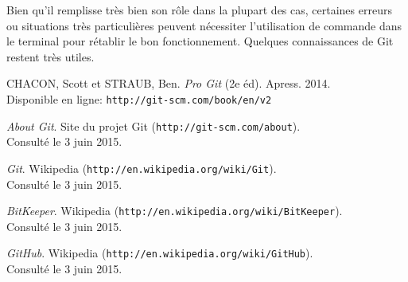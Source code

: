 \documentclass[11pt,a4paper]{article}
\begin{document}
Bien qu'il remplisse très bien son rôle dans la plupart des cas, certaines erreurs ou situations très particulières peuvent nécessiter l'utilisation de commande dans le terminal pour rétablir le bon fonctionnement.
Quelques connaissances de Git restent très utiles.

\pagebreak
\begin{thebibliography}{1}

	CHACON, Scott et STRAUB, Ben. {\em Pro Git} (2e éd). Apress. 2014. \\
	Disponible en ligne: {\tt http://git-scm.com/book/en/v2}

	{\em About Git}. Site du projet Git ({\tt http://git-scm.com/about}). \\
	Consulté le 3 juin 2015.

	{\em Git}. Wikipedia ({\tt http://en.wikipedia.org/wiki/Git}). \\
	Consulté le 3 juin 2015.

	{\em BitKeeper}. Wikipedia ({\tt http://en.wikipedia.org/wiki/BitKeeper}). \\
	Consulté le 3 juin 2015.

	{\em GitHub}. Wikipedia ({\tt http://en.wikipedia.org/wiki/GitHub}). \\
	Consulté le 3 juin 2015.
	
\end{thebibliography}
\end{document}
